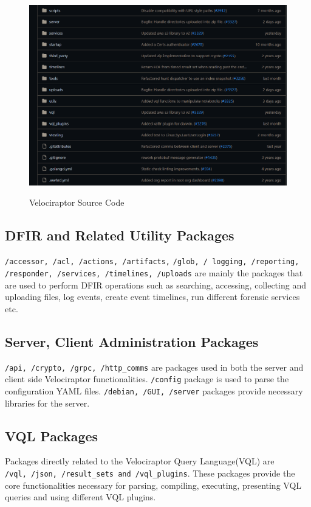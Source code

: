 \documentclass[a4paper, 11pt, oneside]{article} %
\begin{document}
\begin{figure}[ht]
    \centering
    \includegraphics[width=\linewidth, scale=0.35, center]{img/src/3.png}
    \label{fig:src3}
    \caption{Velociraptor Source Code}
\end{figure}

\subsection{DFIR and Related Utility Packages}
\verb|/accessor, /acl, /actions, /artifacts,| \verb|/glob, / logging, /reporting,| \verb|/responder, /services, /timelines, /uploads| are mainly the packages that are used to perform DFIR operations such as searching, accessing, collecting and uploading files, log events, create event timelines, run different forensic services etc.

\subsection{Server, Client Administration Packages}
\verb|/api, /crypto, /grpc, /http_comms| are packages used in both the server and client side Velociraptor functionalities. \verb|/config| package is used to parse the configuration YAML files. \verb|/debian, /GUI, /server| packages provide necessary libraries for the server. 

\subsection{VQL Packages}
Packages directly related to the Velociraptor Query Language(VQL) are \\
\verb|/vql, /json, /result_sets and /vql_plugins|. These packages provide the core functionalities necessary for parsing, compiling, executing, presenting VQL queries and using different VQL plugins.
\end{document}
